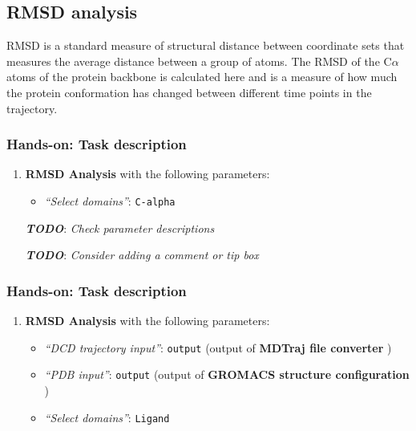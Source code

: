\documentclass[twocolumn]{bmcart}%
\providecommand{\tightlist}{%
  \setlength{\itemsep}{0pt}\setlength{\parskip}{0pt}}
\providecommand{\tightlist}{%
  \setlength{\itemsep}{0pt}\setlength{\parskip}{0pt}}
\begin{document}
\hypertarget{rmsd-analysis}{%
\subsection*{RMSD analysis}\label{rmsd-analysis}}

RMSD is a standard measure of structural distance between coordinate
sets that measures the average distance between a group of atoms. The
RMSD of the C$\alpha$ atoms of the protein backbone is calculated here and
is a measure of how much the protein conformation has changed between different time
points in the trajectory.

\begin{handson_box_colour}
\hypertarget{hands-on-task-description-9}{%
\subsubsection*{Hands-on: Task
description}\label{hands-on-task-description-9}}

\begin{enumerate}
\def\labelenumi{\arabic{enumi}.}
\tightlist
\item
  \textbf{RMSD Analysis} with the following parameters:

  \begin{itemize}
  \tightlist
  \item
    \emph{``Select domains''}: \texttt{C-alpha}
  \end{itemize}

  \textbf{\emph{TODO}}: \emph{Check parameter descriptions}

  \textbf{\emph{TODO}}: \emph{Consider adding a comment or tip box}
\end{enumerate}


\hypertarget{hands-on-task-description-10}{%
\subsubsection*{Hands-on: Task
description}\label{hands-on-task-description-10}}

\begin{enumerate}
\def\labelenumi{\arabic{enumi}.}
\tightlist
\item
  \textbf{RMSD Analysis} with the following parameters:

  \begin{itemize}
  \tightlist
  \item
    \emph{``DCD trajectory input''}: \texttt{output} (output of
    \textbf{MDTraj file converter} )
  \item
    \emph{``PDB input''}: \texttt{output} (output of \textbf{GROMACS
    structure configuration} )
  \item
    \emph{``Select domains''}: \texttt{Ligand}
  \end{itemize}


\end{enumerate}
\end{handson_box_colour}
\end{document}
